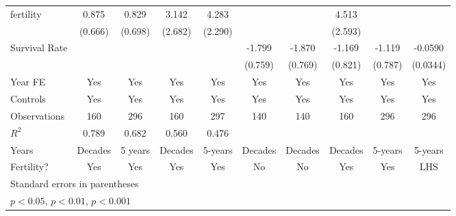 \begin{table}[htbp]
\begin{tabular}{l*{9}{c}}
\addlinespace
fertility       &    0.875         &    0.829         &    3.142         &    4.283         &                  &                  &    4.513         &                  &                  \\
                &  (0.666)         &  (0.698)         &  (2.682)         &  (2.290)         &                  &                  &  (2.593)         &                  &                  \\
\addlinespace
Survival Rate   &                  &                  &                  &                  &   -1.799\sym{*}  &   -1.870\sym{*}  &   -1.169         &   -1.119         &  -0.0590         \\
                &                  &                  &                  &                  &  (0.759)         &  (0.769)         &  (0.821)         &  (0.787)         & (0.0344)         \\
\addlinespace
Year FE         &      Yes         &      Yes         &      Yes         &      Yes         &      Yes         &      Yes         &      Yes         &      Yes         &      Yes         \\
\addlinespace
Controls        &      Yes         &      Yes         &      Yes         &      Yes         &      Yes         &      Yes         &      Yes         &      Yes         &      Yes         \\
\midrule
Observations    &      160         &      296         &      160         &      297         &      140         &      140         &      160         &      296         &      296         \\
\(R^{2}\)       &    0.789         &    0.682         &    0.560         &    0.476         &                  &                  &                  &                  &                  \\
Years           &  Decades         &  5 years         &  Decades         &  5-years         &  Decades         &  Decades         &  Decades         &  5-years         &  5-years         \\
Fertility?      &      Yes         &      Yes         &      Yes         &      Yes         &       No         &       No         &      Yes         &      Yes         &      LHS         \\
\bottomrule
\multicolumn{10}{l}{\footnotesize Standard errors in parentheses}\\
\multicolumn{10}{l}{\footnotesize \sym{*} \(p<0.05\), \sym{**} \(p<0.01\), \sym{***} \(p<0.001\)}\\
\end{tabular}
\end{table}
